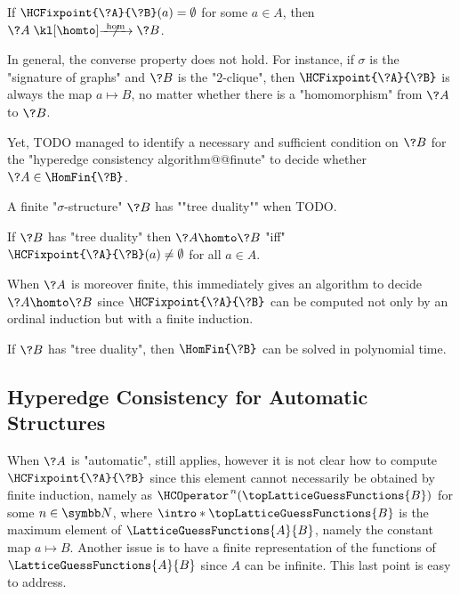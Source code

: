 \begin{corollary}
	If $\HCFixpoint{\?A}{\?B}(a) = \emptyset$ for some $a\in A$, then
	$\?A \nothomto \?B$.
\end{corollary}

In general, the converse property does not hold. For instance, if $\sigma$ is the
"signature of graphs" and $\?B$ is the "$2$-clique", then $\HCFixpoint{\?A}{\?B}$
is always the map $a \mapsto B$, no matter whether there is a "homomorphism" from
$\?A$ to $\?B$.

Yet, TODO managed to identify a necessary and sufficient condition on $\?B$ for
the "hyperedge consistency algorithm@@finute" to decide whether $\?A \in \HomFin{\?B}$.
\begin{definition}
	A finite "$\sigma$-structure" $\?B$ has ""tree duality"" when TODO.
\end{definition}

\begin{proposition}
	\AP\label{prop:hyperedge-consistency-tree-duality}
	If $\?B$ has "tree duality" then $\?A \homto \?B$ "iff"
	$\HCFixpoint{\?A}{\?B}(a) \neq \emptyset$ for all $a\in A$.
\end{proposition}

When $\?A$ is moreover finite, this immediately gives an algorithm to decide
$\?A \homto \?B$ since $\HCFixpoint{\?A}{\?B}$ can be computed not only
by an ordinal induction but with a finite induction.

\begin{corollary}
	If $\?B$ has "tree duality", then $\HomFin{\?B}$ can be solved in
	polynomial time.
\end{corollary}


\subsection{Hyperedge Consistency for Automatic Structures}

When $\?A$ is "automatic",  still applies,
however it is not clear how to compute $\HCFixpoint{\?A}{\?B}$ since this element cannot
necessarily be obtained by finite induction, namely as
$\HCOperator^{\,n}(\topLatticeGuessFunctions{B})$ for some $n\in\N$, where
\AP$\intro*\topLatticeGuessFunctions{B}$ is the maximum element
of $\LatticeGuessFunctions{A}{B}$, namely the constant map $a \mapsto B$.
Another issue is to have a finite representation of the functions of
$\LatticeGuessFunctions{A}{B}$ since $A$ can be infinite. This last point is easy to address.

